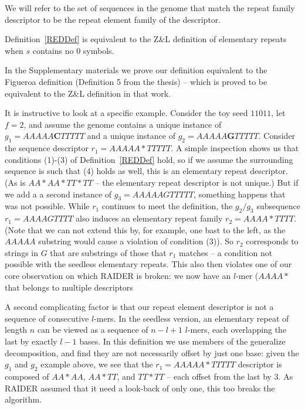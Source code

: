 \documentclass{bmcart}
\begin{document}
We will refer to the set of sequences in the genome that match the
repeat family descriptor to be the repeat element family of the
descriptor.

\begin{theorem}
Definition~\ref{REDDef} is equivalent to the Z\&L
definition of elementary repeats when $s$ contains no 0 symbols.
\end{theorem}
In the Supplementary materials we prove our definition equivalent to
the Figueroa definition (Definition 5 from the thesis) -- which is
proved to be equivalent to the Z\&L definition in that work.

It is instructive to look at a specific example.  Consider the toy
seed $11011$, let $f=2$, and assume the genome contains a unique
instance of $g_1 = AAAAA{\mathbf C}TTTTT$ and a unique instance of
$g_2 = AAAAA{\mathbf G}TTTTT$.  Consider the sequence descriptor
$r_1 = AAAAA*TTTTT$.  A simple inspection shows us that conditions (1)-(3)
of Definition~\ref{REDDef} hold, so if we assume the surrounding
sequence is such that (4) holds as well, this is an elementary repeat
descriptor.  (As is $AA*AA*TT*TT$ -- the elementary repeat descriptor
is not unique.)  But if we add a a second instance of $g_3 = AAAAAGTTTTT$,
something happens that was not possible.  While $r_1$ continues to
meet the definition, the $g_2/g_3$ subsequence $r_1 = AAAAGTTTT$ also
induces an elementary repeat family $r_2 = AAAA*TTTT$. (Note that we can not
extend this by, for example, one bast to the left, as the $AAAAA$
substring would cause a violation of condition (3)).  So $r_2$
corresponds to strings in $G$ that are substrings of those that $r_1$
matches -- a condition not possible with the seedless elementary
repeats.  This also then violates one of our core observation on which
RAIDER is broken: we now
have an $l$-mer ($AAAA*$ that belongs to multiple descriptors

A second complicating factor is that our repeat element descriptor is
not a sequence of consecutive $l$-mers. In the seedless version, an
elementary repeat of length $n$ can be viewed as a sequence of $n-l+1$
$l$-mers, each overlapping the last by exactly $l-1$ bases. In this
definition we use members of the generalize decomposition, and find
they are not necessarily offset by just one base: given the $g_1$ and
$g_2$ example above, we see that the $r_1 = AAAAA*TTTTT$ descriptor is
composed of $AA*AA$, $AA*TT$, and $TT*TT$ -- each offset from the last
by 3.  As RAIDER assumed that it need a look-back of only one, this
too breaks the algorithm.
\end{document}

